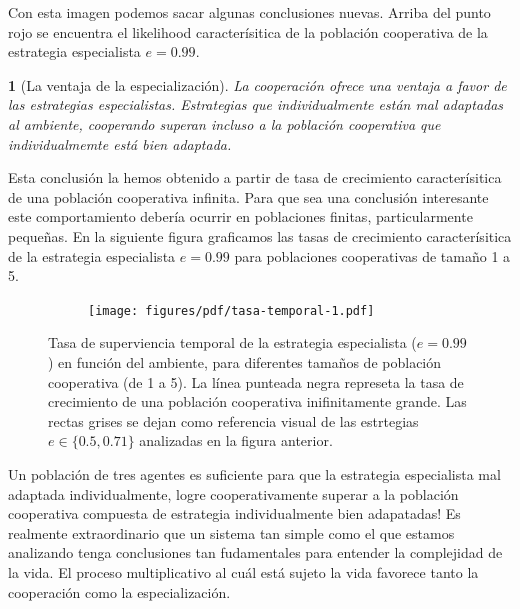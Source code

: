 \documentclass[a4paper,10pt]{article}
\newif\ifen
\newif\ifes
\newcommand{\en}[1]{\ifen#1\fi}
\newcommand{\es}[1]{\ifes#1\fi}
\newtheorem{conclution}{\en{Conclution}\es{Conclusión}}%
\begin{document}

Con esta imagen podemos sacar algunas conclusiones nuevas.
Arriba del punto rojo se encuentra el likelihood caracterísitica de la población cooperativa de la estrategia especialista $e=0.99$.

\begin{conclution}[La ventaja de la especialización]
La cooperación ofrece una ventaja a favor de las estrategias especialistas. Estrategias que individualmente están mal adaptadas al ambiente, cooperando superan incluso a la población cooperativa que individualmemte está bien adaptada.
\end{conclution}

Esta conclusión la hemos obtenido a partir de tasa de crecimiento caracterísitica de una población cooperativa infinita.
Para que sea una conclusión interesante este comportamiento debería ocurrir en poblaciones finitas, particularmente pequeñas.
En la siguiente figura graficamos las tasas de crecimiento caracterísitica de la estrategia especialista $e=0.99$ para poblaciones cooperativas de tamaño 1 a 5.
%
\begin{figure}[H]
    \centering
    \begin{subfigure}[b]{0.66\textwidth}
    \texttt{[image: figures/pdf/tasa-temporal-1.pdf]}
    \end{subfigure}
    \caption{
    Tasa de superviencia temporal de la estrategia especialista ($e=0.99$) en función del ambiente, para diferentes tamaños de población cooperativa (de 1 a 5).
    La línea punteada negra represeta la tasa de crecimiento de una población cooperativa inifinitamente grande.
    Las rectas grises se dejan como referencia visual de las estrtegias $e \in \{0.5, 0.71\}$ analizadas en la figura anterior.
    }
    \label{fig:multilevel-selection-1}
\end{figure}
%
Un población de tres agentes es suficiente para que la estrategia especialista mal adaptada individualmente, logre cooperativamente superar a la población cooperativa compuesta de estrategia individualmente bien adapatadas!
Es realmente extraordinario que un sistema tan simple como el que estamos analizando tenga conclusiones tan fudamentales para entender la complejidad de la vida.
El proceso multiplicativo al cuál está sujeto la vida favorece tanto la cooperación como la especialización.

\end{document}
